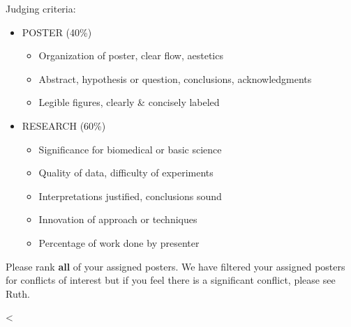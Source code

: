 \documentclass[12pt]{article}
\begin{document}
Judging criteria:
\begin{itemize}
\item POSTER (40\%)
  \begin{itemize}
  \item Organization of poster, clear flow, aestetics
  \item Abstract, hypothesis or question, conclusions, acknowledgments
  \item Legible figures, clearly \& concisely labeled
  \end{itemize}
\item RESEARCH (60\%)
  \begin{itemize}
  \item Significance for biomedical or basic science
  \item Quality of data, difficulty of experiments
  \item Interpretations justified, conclusions sound
  \item Innovation of approach or techniques
  \item Percentage of work done by presenter
  \end{itemize}
\end{itemize}

\noindent Please rank {\bfseries all} of your assigned posters. We have filtered your
assigned posters for conflicts of interest but if you feel there is a
significant conflict, please see Ruth.
\newpage %

<%
\end{document}
